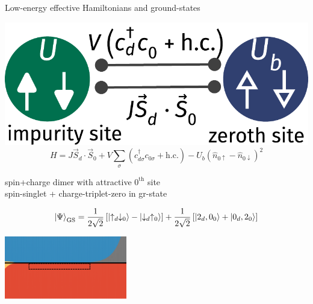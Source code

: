 \documentclass[9pt,aspectratio=169]{beamer}
\begin{document}
\begin{frame}{Low-energy effective Hamiltonians and ground-states}
{{\begin{minipage}{0.4\textwidth}
\includegraphics[width=\textwidth]{siam-JV.pdf}
\[H = J \vec{S}_d\cdot\vec{S}_0 + V \sum_\sigma \left( c^\dagger_{d\sigma}c_{0\sigma} + \text{h.c.} \right) - U_b\left( \hat n_{0 \uparrow} - \hat n_{0 \downarrow} \right)^2\]
\end{minipage}
\hspace*{\fill}
\begin{minipage}{0.5\textwidth}
\vspace*{\fill}
\begin{enumerate}
	\nitem \alert{spin+charge} dimer with attractive \(0^\text{th}\) site\\[6pt]
\nitem spin-singlet + charge-triplet-zero in gr-state\\[10pt]
\end{enumerate}
\[ \ket{\Psi}_\text{GS} = \frac{1}{2\sqrt 2}\left[\ket{\uparrow_d \downarrow_0} - \ket{\downarrow_d \uparrow_0}\right] + \frac{1}{2\sqrt 2}\left[\ket{2_d, 0_0} + \ket{0_d, 2_0} \right]\]
\end{minipage}
}

\vspace*{\fill}

\includegraphics[width=0.4\textwidth]{phase-map-MIT2.pdf}
}

\end{frame}
\end{document}
